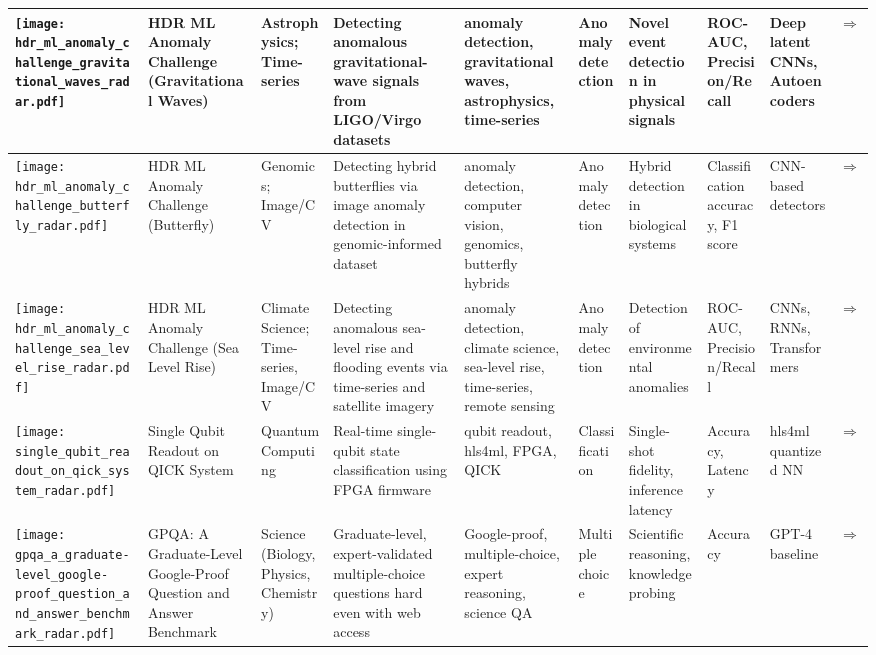 \begin{landscape}
{\begin{longtable}{|p{}|p{}|p{}|p{}|p{}|p{}|p{}|p{}|p{}|p{}|}
\texttt{[image: hdr\_ml\_anomaly\_challenge\_gravitational\_waves\_radar.pdf]} & HDR ML Anomaly Challenge (Gravitational Waves) & Astrophysics; Time-series & Detecting anomalous gravitational-wave signals from LIGO/Virgo datasets & anomaly detection, gravitational waves, astrophysics, time-series & Anomaly detection & Novel event detection in physical signals & ROC-AUC, Precision/Recall & Deep latent CNNs, Autoencoders & \cite{campolongo2025buildingmachinelearningchallenges}\href{https://www.codabench.org/competitions/2626/}{$\Rightarrow$} \\ \hline
\texttt{[image: hdr\_ml\_anomaly\_challenge\_butterfly\_radar.pdf]} & HDR ML Anomaly Challenge (Butterfly) & Genomics; Image/CV & Detecting hybrid butterflies via image anomaly detection in genomic-informed dataset & anomaly detection, computer vision, genomics, butterfly hybrids & Anomaly detection & Hybrid detection in biological systems & Classification accuracy, F1 score & CNN-based detectors & \cite{campolongo2025buildingmachinelearningchallenges2}\href{https://www.codabench.org/competitions/3764/}{$\Rightarrow$} \\ \hline
\texttt{[image: hdr\_ml\_anomaly\_challenge\_sea\_level\_rise\_radar.pdf]} & HDR ML Anomaly Challenge (Sea Level Rise) & Climate Science; Time-series, Image/CV & Detecting anomalous sea-level rise and flooding events via time-series and satellite imagery & anomaly detection, climate science, sea-level rise, time-series, remote sensing & Anomaly detection & Detection of environmental anomalies & ROC-AUC, Precision/Recall & CNNs, RNNs, Transformers & \cite{campolongo2025buildingmachinelearningchallenges3}\href{https://www.codabench.org/competitions/3223/}{$\Rightarrow$} \\ \hline
\texttt{[image: single\_qubit\_readout\_on\_qick\_system\_radar.pdf]} & Single Qubit Readout on QICK System & Quantum Computing & Real-time single-qubit state classification using FPGA firmware & qubit readout, hls4ml, FPGA, QICK & Classification & Single-shot fidelity, inference latency & Accuracy, Latency & hls4ml quantized NN & \cite{diguglielmo2025endtoendworkflowmachinelearningbased}\href{https://github.com/fastmachinelearning/ml-quantum-readout}{$\Rightarrow$} \\ \hline
\texttt{[image: gpqa\_a\_graduate-level\_google-proof\_question\_and\_answer\_benchmark\_radar.pdf]} & GPQA: A Graduate-Level Google-Proof Question and Answer Benchmark & Science (Biology, Physics, Chemistry) & Graduate-level, expert-validated multiple-choice questions hard even with web access & Google-proof, multiple-choice, expert reasoning, science QA & Multiple choice & Scientific reasoning, knowledge probing & Accuracy & GPT-4 baseline & \cite{rein2023gpqagraduatelevelgoogleproofqa2}\href{https://arxiv.org/abs/2311.12022}{$\Rightarrow$} \\ \hline

\end{longtable}}
\end{landscape}
